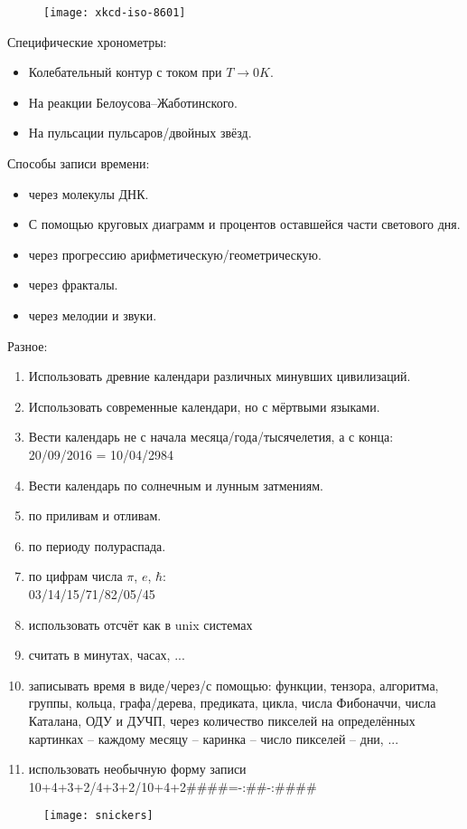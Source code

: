 \begin{flushleft}
    \begin{figure}[ht!]
        \centering
        \texttt{[image: xkcd-iso-8601]}
    \end{figure}

    Специфические хронометры:
    \begin{itemize}
        \item Колебательный контур с током при \( T \to 0 K \).
        \item На реакции Белоусова--Жаботинского.
        \item На пульсации пульсаров/двойных звёзд.
    \end{itemize}

    Способы записи времени:
    \begin{itemize}
        \item через молекулы ДНК.
        \item С помощью круговых диаграмм и процентов оставшейся части светового дня.
        \item через прогрессию арифметическую/геометрическую.
        \item через фракталы.
        \item через мелодии и звуки.
    \end{itemize}

    Разное:
    \begin{enumerate}
        \item Использовать древние календари различных минувших цивилизаций.
        \item Использовать современные календари, но с мёртвыми языками.
        \item Вести календарь не с начала месяца/года/тысячелетия, а с конца:\\
            20/09/2016 = 10/04/2984
        \item Вести календарь по солнечным и лунным затмениям.
        \item по приливам и отливам.
        \item по периоду полураспада.
        \item по цифрам числа \( \pi \), \( e \), \( \hbar \):\\
            03/14/15/71/82/05/45
        \item использовать отсчёт как в unix системах
        \item считать в минутах, часах, ...
        \item записывать время в виде/через/с помощью: функции, тензора, алгоритма, группы, кольца, графа/дерева, 
            предиката, цикла, числа Фибоначчи, числа Каталана, ОДУ и ДУЧП, через количество пикселей на 
            определённых картинках -- каждому месяцу -- каринка -- число пикселей -- дни, ...
        \item использовать необычную форму записи\\
            10+4+3+2/4+3+2/10+4+2\qquad \#\#\#\#=-:\#\#-:\#\#\#\#
    \end{enumerate}
\end{flushleft}

\begin{figure}[ht!]
    \centering
    \texttt{[image: snickers]}
\end{figure}